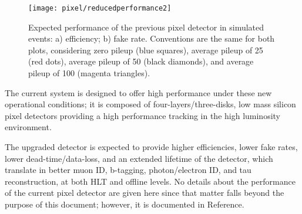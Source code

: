 \begin{figure}[!h]
\centering
\texttt{[image: pixel/reducedperformance2]}
\caption[Expected performance of the previous pixel detector in simulated \ttbar events.]{Expected performance of the previous pixel detector in simulated \ttbar events: a) efficiency; b) fake rate. Conventions are the same for both plots, considering zero pileup (blue squares), average pileup of 25 (red dots), average pileup of 50 (black diamonds), and average pileup of 100 (magenta triangles).}\label{fig:reduced_performance}
\end{figure}

The current system is designed to offer high performance under these new operational conditions; it is composed of four-layers/three-disks, low mass silicon pixel detectors providing a high performance tracking in the high luminosity environment.



The upgraded detector is expected to provide higher efficiencies, lower fake rates, lower dead-time/data-loss, and an extended lifetime of the detector, which translate in better muon ID, b-tagging, photon/electron ID, and tau reconstruction, at both HLT and offline levels. No details about the performance of the current pixel detector are given here since that matter falls beyond the purpose of this document; however, it is documented in Reference\cite{pixel_performance}.

